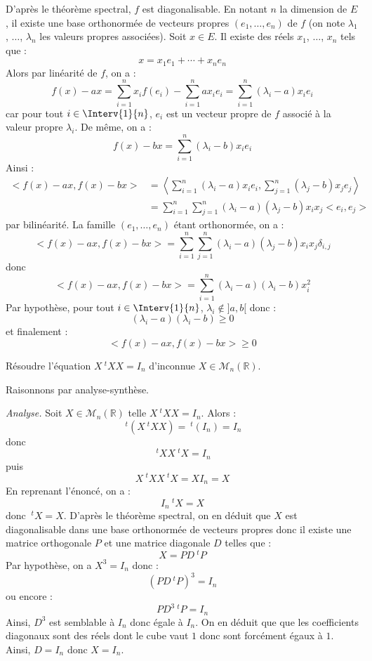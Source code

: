 \documentclass[a4paper,10pt]{report}
\begin{document}
\corr D'après le théorème spectral, $f$ est diagonalisable. En notant $n$ la dimension de $E$, il existe une base orthonormée de vecteurs propres $(e_1, \ldots, e_n)$ de $f$ (on note $\lambda_1$, $\ldots$, $\lambda_n$ les valeurs propres associées). Soit $x \in E$. Il existe des réels $x_1$, $\ldots$, $x_n$ tels que :
$$ x=  x_1 e_1 + \cdots +  x_n e_n$$ 
Alors par linéarité de $f$, on a :
$$ f(x)-ax = \sum_{i=1}^n x_i f(e_i) - \sum_{i=1}^n  a x_i e_i =  \sum_{i=1}^n (\lambda_i-a) x_i  e_i $$
car pour tout $i \in \Interv{1}{n}$, $e_i$ est un vecteur propre de $f$ associé à la valeur propre $\lambda_i$. De même, on a :
$$ f(x)-bx = \sum_{i=1}^n (\lambda_i-b) x_i  e_i $$
Ainsi :
\begin{align*}
<f(x)-ax,f(x)-bx> & = \left< \sum_{i=1}^n (\lambda_i-a) x_i  e_i , \sum_{j=1}^n (\lambda_j-b) x_j  e_j \right> \\
& = \sum_{i=1}^n \sum_{j=1}^n (\lambda_i - a)(\lambda_j-b) x_i x_j <e_i,e_j> 
\end{align*}
par bilinéarité. La famille $(e_1, \ldots, e_n)$ étant orthonormée, on a :
$$ <f(x)-ax,f(x)-bx> = \sum_{i=1}^n \sum_{j=1}^n (\lambda_i - a)(\lambda_j-b) x_i x_j \delta_{i,j}$$
donc
$$ <f(x)-ax,f(x)-bx> = \sum_{i=1}^n (\lambda_i - a)(\lambda_i-b) x_i^2$$
Par hypothèse, pour tout $i \in \Interv{1}{n}$, $\lambda_i \notin ]a,b[$ donc :
$$ (\lambda_i - a)(\lambda_i-b) \geq 0$$
et finalement :
$$ <f(x)-ax,f(x)-bx> \geq 0$$

\begin{Exa} Résoudre l'équation $X ~^tX X= I_n$ d'inconnue $X \in \mathcal{M}_n(\mathbb{R})$.
\end{Exa}

\corr Raisonnons par analyse-synthèse.

\medskip

\noindent \textit{Analyse.} Soit $X \in \mathcal{M}_n(\mathbb{R})$ telle $X ~^tX X= I_n$. Alors :
$$ ~^t (X ~^tX X) =  ~^t(I_n)= I_n$$
donc
$$ ~^tX X ~^tX = I_n$$
puis
$$ X  ~^tX X ~^tX = X I_n= X$$
En reprenant l'énoncé, on a :
$$ I_n ~^tX = X$$
donc $~^tX = X$. D'après le théorème spectral, on en déduit que $X$ est diagonalisable dans une base orthonormée de vecteurs propres donc il existe une matrice orthogonale $P$ et une matrice diagonale $D$ telles que :
$$ X = PD ~^tP$$
Par hypothèse, on a $X^3=I_n$ donc :
$$ (PD ~^tP)^3= I_n$$
ou encore :
$$ PD^3 ~^tP=I_n$$
Ainsi, $D^3$ est semblable à $I_n$ donc égale à $I_n$. On en déduit que que les coefficients diagonaux sont des réels dont le cube vaut $1$ donc sont forcément égaux à $1$. Ainsi, $D=I_n$ donc $X=I_n$.
\end{document}
